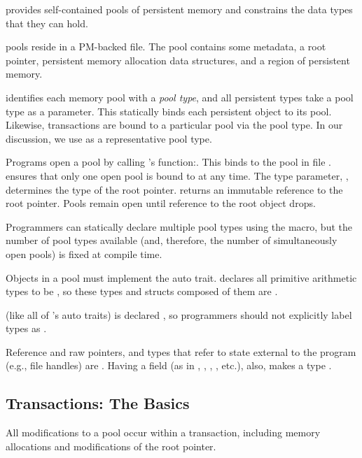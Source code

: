 \This{} provides self-contained pools of persistent memory and constrains the
data types that they can hold.

 \This{} pools reside in a
PM-backed file.  The pool contains some metadata, a root pointer, persistent
memory allocation data structures, and a region of persistent memory.

\This{} identifies each memory pool with a \emph{pool type}, and all persistent
types take a pool type as a parameter.  This statically binds each persistent
object to its pool.  Likewise, transactions are bound to a particular pool via
the pool type.  In our discussion, we use  as a representative pool
type.

Programs open a pool by calling 's  function:\linebreak{}.  This binds  to the pool in file
.  \This{} ensures that only one open pool is bound to  at
any time.  The type parameter, , determines the type of the root
pointer.   returns an immutable reference to the root pointer.  Pools remain
open until reference to the root object drops.

Programmers can statically declare multiple pool types using the
 macro, but the number of pool types available (and,
therefore, the number of simultaneously open pools) is fixed at compile time.

 Objects in a pool must implement the
 auto trait.  \This{} declares all primitive arithmetic types to be
, so these types and structs composed of them are .

 (like all of \this{}'s auto traits) is declared
, so programmers should not explicitly label types as .

Reference and raw pointers, and types that refer to state external to the program (e.g., file handles) are . Having a  field (as in , , ,
, etc.), also, makes a type .



\subsection{Transactions: The Basics}

All modifications to a \this{} pool occur within a transaction, including
memory allocations and modifications of the root pointer.

